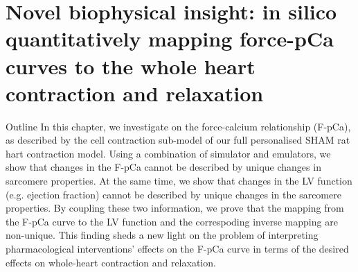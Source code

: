 \chapter{Novel biophysical insight: in silico quantitatively mapping force-pCa curves to the whole heart contraction and relaxation}\label{cha:chapter8}
%
%
%
\begin{remark}{Outline}
    In this chapter, we investigate on the force-calcium relationship (F-pCa), as described by the cell contraction sub-model of our full personalised SHAM rat hart contraction model. Using a combination of simulator and emulators, we show that changes in the F-pCa cannot be described by unique changes in sarcomere properties. At the same time, we show that changes in the LV function (e.g. ejection fraction) cannot be described by unique changes in the sarcomere properties. By coupling these two information, we prove that the mapping from the F-pCa curve to the LV function and the correspoding inverse mapping are non-unique. This finding sheds a new light on the problem of interpreting pharmacological interventions' effects on the F-pCa curve in terms of the desired effects on whole-heart contraction and relaxation.
\end{remark}







